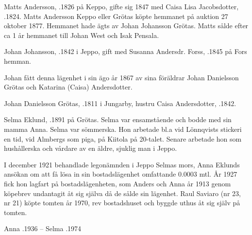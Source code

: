 Matts Andersson, .1826 på Keppo, gifte sig 1847 med Caisa Lisa Jacobsdotter, .1824. Matts Andersson Keppo eller Grötas köpte hemmanet på auktion 27 oktober 1877. Hemmanet hade ägts av Johan Johansson Grötas. Matts sålde efter ca 1 år hemmanet till Johan West och Isak Pensala.


Johan Johansson, .1842 i Jeppo, gift med Susanna Andersdr. Forss, .1845 på Fors hemman.
\begin{jhchildren}
  \item {}
  \item {}
  \item {}
  \item {}
  \item {}
  \item {}
\end{jhchildren}
Johan fått denna lägenhet i sin ägo år 1867 av sina föräldrar Johan	Danielsson Grötas och Katarina (Caisa) Andersdotter.

Johan Danielsson Grötas, .1811 i Jungarby, hustru Caisa Andersdotter, .1842.




Selma Eklund, .1891 på Grötas. Selma var ensamstående och bodde med sin mamma Anna. Selma var sömmerska. Hon arbetade bl.a vid Lönnqvists stickeri en tid, vid Almbergs som piga, på Kiitola på 20-talet. Senare arbetade hon som hushållerska och vårdare av en äldre, sjuklig man i Jeppo.

I december 1921 behandlade legonämnden i Jeppo Selmas mors, Anna Eklunds ansökan om att få lösa in sin bostadslägenhet omfattande 0.0003 mtl. År 1927 fick hon lagfart på bostadslägenheten, som Anders och Anna år 1913 genom köpebrev undantagit  åt sig själva då de sålde sin lägenhet. Raul Saviaro (nr 23, nr 21) köpte tomten år 1970, rev bostadshuset och byggde uthus åt sig själv på tomten.

Anna .1936  --  Selma .1974



